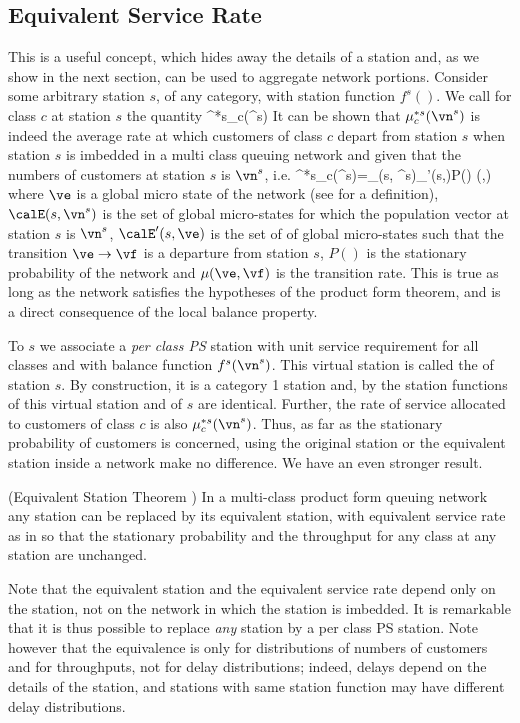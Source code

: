 \subsection{Equivalent Service Rate} This is a
useful concept, which hides away the details of a
station and, as we show in the next section, can
be used to aggregate network portions.
Consider some arbitrary station $s$, of any
category, with station function $f^s()$. We call
 for class $c$
at station $s$ the quantity
 \be
  \mu^{*s}_c(\vn^s)\eqdef {}
\label{eq-q-qnet-eqsrvrat}
   \ee
It can be shown that
$\mu^{*s}_c(\vn^s)$ is indeed the average rate at which customers of class $c$ depart from station $s$ when station $s$ is imbedded in a multi class queuing network and given that the numbers of customers at station $s$ is $\vn^s$, i.e.
  \ben
  \mu^{*s}_c(\vn^s)=\sum_{\ve \in \calE(s, \vn^s)}\sum_{\vf \in \calE'(s,\ve)}P(\ve) \mu(\ve,\vf)
  \een
where $\ve$ is a global micro state of the network (see  for a definition), $\calE(s,\vn^s)$ is the set of global micro-states for which the population vector at station $s$ is $\vn^s$, $\calE'(s, \ve)$ is the set of of global micro-states such that the transition $\ve \to \vf$ is a departure from station $s$, $P()$ is the stationary probability of the network and $\mu(\ve,\vf)$ is the transition rate. This is true as long as the network satisfies the hypotheses of the product form theorem, and is a direct consequence of the local balance property.

To $s$
we associate a \emph{per class PS} station with unit service
requirement for all classes and with balance function $f^s(\vn^s)$.
 This virtual station
is called the  of station
$s$. By construction, it is a category 1 station
and, by  the station functions
of this virtual station and of $s$ are identical. Further, the rate of service allocated to customers of class $c$ is also $\mu^{*s}_c(\vn^s)$. Thus, as far as the stationary probability of
customers is concerned, using the original
station or the equivalent station inside a network make no
difference. We have an even stronger result.

\begin{shadethm}(Equivalent Station Theorem \cite{MR563738})
In a multi-class product form queuing network any station can
be replaced by its equivalent station, with equivalent service
rate as in  so that the stationary
probability and the throughput for any class at any station are
unchanged.
\end{shadethm}
Note that the equivalent station and the
equivalent service rate depend only on the
station, not on the network in which the station
is imbedded. It is remarkable that it is thus
possible to replace \emph{any} station by a per
class PS station. Note however that the
equivalence is only for distributions of numbers
of customers and for throughputs, not for delay
distributions; indeed, delays depend on the
details of the station, and stations with same
station function may have different delay
distributions.

